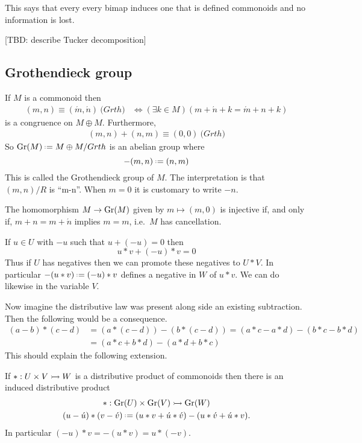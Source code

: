 This says that every every bimap induces one that is defined commonoids and no information is lost.

[TBD: describe Tucker decomposition]

\subsection{Grothendieck group}

\begin{theorem}
    If $M$ is a commonoid then 
    \begin{align*}
        (m,n) \equiv (\acute{m},\acute{n}) \pod{Grth} & \Leftrightarrow (\exists k\in M)(m+\acute{n}+k=\acute{m}+n+k)
    \end{align*}
    is a congruence on $M\oplus M$.  Furthermore,
    \begin{align*}
        (m,n)+(n,m) \equiv (0,0) \pod{Grth}
    \end{align*}
    So $\Gr(M)\defeq M\oplus M/Grth$ is an abelian group where 
    \[
        -(m,n)\defeq (n,m)
    \]
    This is called the Grothendieck group of $M$.
    The interpretation is that $(m,n)/R$ is ``m-n''.  When $m=0$ it is customary to write $-n$.

    The homomorphism $M\to \operatorname{Gr}(M)$ given by $m\mapsto (m,0)$ is injective 
    if, and only if, $m+n=m+\acute{n}$ implies $m=m$, i.e.\ $M$ has cancellation.
\end{theorem}

\begin{proposition}
    If $u\in U$ with $-u$ such that $u+(-u)=0$ then 
    \[
        u*v + (-u)*v =0
    \]
    Thus if $U$ has negatives then we can promote these negatives to $U*V$.
    In particular $-(u*v)\defeq (-u)*v$ defines a negative in $W$ of $u*v$.
    We can do likewise in the variable $V$.  
\end{proposition}
Now imagine the distributive law was present along side an existing subtraction.
Then the following would be a consequence.
\begin{align*}
    (a-b)*(c-d) & = (a*(c-d))-(b*(c-d))
        = (a*c-a*d)-(b*c-b*d)\\
        & =(a*c+b*d)-(a*d+b*c)
\end{align*}
This should explain the following extension.

\begin{corollary}
    If $*:U\times V\rightarrowtail W$ is a distributive product of commonoids then there is an 
    induced distributive product 
    \begin{gather*}
        * :\Gr(U)\times \Gr(V)\bmto \Gr(W)\\
        (u-\acute{u})*(v-\acute{v})
        \defeq (u*v+\acute{u}*\acute{v})-(u*\acute{v}+\acute{u}*v).
    \end{gather*}
    In particular $(-u)*v=-(u*v)=u*(-v)$.
\end{corollary}

